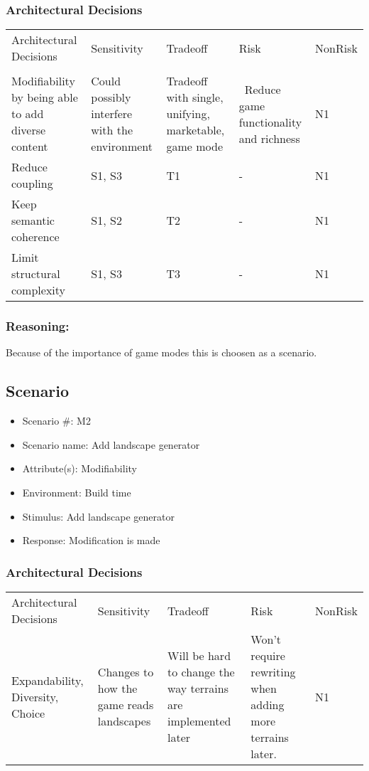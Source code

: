 \documentclass[12pt, a4paper]{article}
\begin{document}
\subsubsection{Architectural Decisions}
\begin{tabular}{ p{} p{} p{}
p{} p{} }
Architectural Decisions & Sensitivity & Tradeoff & Risk & NonRisk \\
 & & & & \\
Modifiability by being able to add diverse content & Could possibly interfere
with the environment & Tradeoff with single, unifying, marketable, game mode
& Reduce game functionality and richness & N1\\
Reduce coupling & S1, S3 & T1 & -  & N1 \\
Keep semantic coherence & S1, S2 & T2 & - &  N1 \\
Limit structural complexity & S1, S3 & T3 & - &  N1 \\
\end{tabular}

\subsubsection{Reasoning:}
Because of the importance of game modes this is choosen as a scenario. 

\subsection{Scenario}
\begin{itemize}
    \item Scenario #: M2
    \item Scenario name: Add landscape generator
    \item Attribute(s): Modifiability
    \item Environment: Build time
    \item Stimulus: Add landscape generator
    \item Response: Modification is made
\end{itemize}

\subsubsection{Architectural Decisions}
\begin{tabular}{ p{} p{} p{}
p{} p{} }
Architectural Decisions & Sensitivity & Tradeoff & Risk & NonRisk \\
Expandability, Diversity, Choice & Changes to how the game reads landscapes &
Will be hard to change the way terrains are implemented later & Won’t require
rewriting when adding more terrains later. & N1 \\
\end{tabular}
\end{document}
